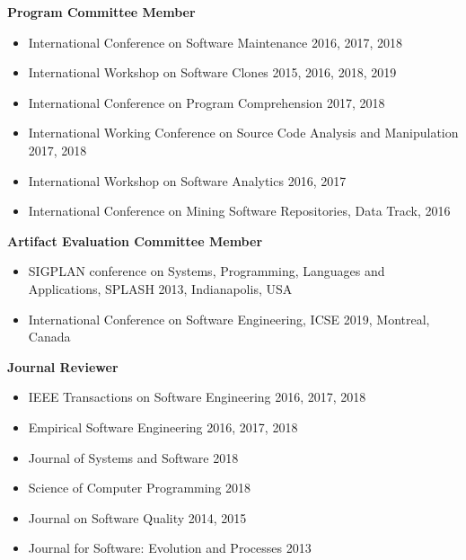 \documentclass[letterpaper,11pt]{article}
\begin{document}
\textbf{Program Committee Member}


\begin{itemize}

  \item\small{International Conference on Software Maintenance 2016, 2017, 2018}
  \vspace{-5pt}\item\small{International Workshop on Software Clones 2015, 2016, 2018, 2019}
  \vspace{-5pt}\item\small{International Conference on Program Comprehension 2017, 2018}
  \vspace{-5pt}\item\small{ International Working Conference on Source Code Analysis and Manipulation 2017, 2018}
  \vspace{-5pt}\item\small{ International Workshop on Software Analytics 2016, 2017}
   \vspace{-5pt}\item\small{International Conference on Mining Software Repositories, Data Track, 2016}

\end{itemize}

\textbf{Artifact Evaluation Committee Member}

\begin{itemize}
\item\small{SIGPLAN conference on Systems, Programming, Languages and Applications, SPLASH 2013,
Indianapolis, USA}
  \vspace{-5pt}\item\small{International Conference on Software Engineering, ICSE 2019,
Montreal, Canada}

\end{itemize}

\textbf{Journal Reviewer}

\begin{itemize}

  \item\small{IEEE Transactions on Software Engineering 2016, 2017, 2018}
  \vspace{-5pt}\item\small{Empirical Software Engineering 2016, 2017, 2018}
  \vspace{-5pt}\item\small{Journal of Systems and Software 2018}
  \vspace{-5pt}\item\small{Science of Computer Programming 2018}
  \vspace{-5pt}\item\small{Journal on Software Quality 2014, 2015}
  \vspace{-5pt}\item\small{Journal for Software: Evolution and Processes 2013}

\end{itemize}
\end{document}
